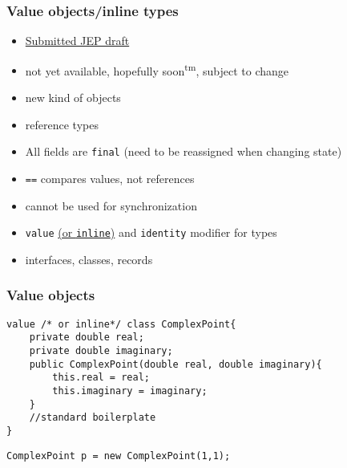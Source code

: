 \documentclass{beamer}
\begin{document}
\begin{frame}
\frametitle{Value objects/inline types}
\begin{itemize}
  \item \href{https://openjdk.org/jeps/8277163}{Submitted JEP draft}
  \item not yet available, hopefully soon\textsuperscript{tm}, subject to change
  \pause
  \item new kind of objects
  \item reference types
  \item All fields are \texttt{final} (need to be reassigned when changing state)
  \item \texttt{==} compares values, not references
  \item cannot be used for synchronization
  \item \texttt{value} \href{https://wiki.openjdk.org/display/valhalla/L-World}{(or \texttt{inline})} and \texttt{identity} modifier for types
  \item interfaces, classes, records
\end{itemize}
\end{frame}
\begin{frame}[fragile]
\frametitle{Value objects}
\begin{lstlisting}
value /* or inline*/ class ComplexPoint{
	private double real;
	private double imaginary;
	public ComplexPoint(double real, double imaginary){
		this.real = real;
		this.imaginary = imaginary;
	}
	//standard boilerplate
}
\end{lstlisting}
\pause
\begin{lstlisting}
ComplexPoint p = new ComplexPoint(1,1);
\end{lstlisting}
\end{frame}
\end{document}
